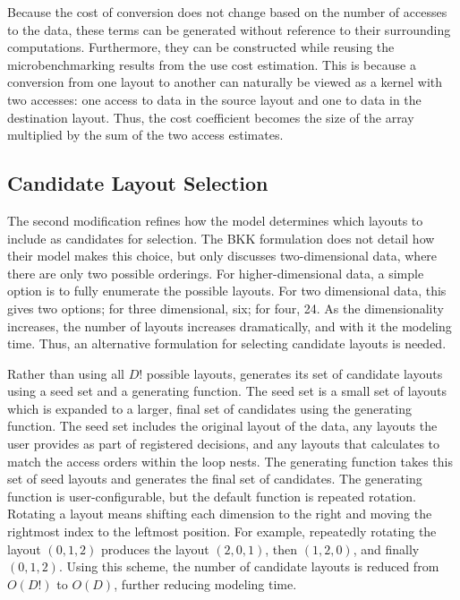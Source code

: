 
Because the cost of conversion does not change based on the number of accesses to the data, these terms can be generated without reference to their surrounding computations.
Furthermore, they can be constructed while reusing the microbenchmarking results from the use cost estimation.
This is because a conversion from one layout to another can naturally be viewed as a kernel with two accesses: one access to data in the source layout and one to data in the destination layout.
Thus, the cost coefficient becomes the size of the array multiplied by the sum of the two access estimates.


\subsection{Candidate Layout Selection}\label{sec:candidateSelection}

The second modification refines how the model determines which layouts to include as candidates for selection.
The BKK formulation does not detail how their model makes this choice, but only discusses two-dimensional data, where there are only two possible orderings.
For higher-dimensional data, a simple option is to fully enumerate the possible layouts.
For two dimensional data, this gives two options; for three dimensional, six; for four, 24.
As the dimensionality increases, the number of layouts increases dramatically, and with it the modeling time.
Thus, an alternative formulation for selecting candidate layouts is needed.

Rather than using all $D!$ possible layouts, \FormatDecisions{} generates its set of candidate layouts using a seed set and a generating function.
The seed set is a small set of layouts which is expanded to a larger, final set of candidates using the generating function.
The seed set includes the original layout of the data, any layouts the user provides as part of registered decisions, and any layouts that \FormatDecisions{} calculates to match the access orders within the loop nests.
The generating function takes this set of seed layouts and generates the final set of candidates.
The generating function is user-configurable, but the default function is repeated rotation.
Rotating a layout means shifting each dimension to the right and moving the rightmost index to the leftmost position.
For example, repeatedly rotating the layout $(0,1,2)$ produces the layout $(2,0,1)$, then $(1,2,0)$, and finally $(0,1,2)$. 
Using this scheme, the number of candidate layouts is reduced from $O(D!)$ to $O(D)$, further reducing modeling time.

